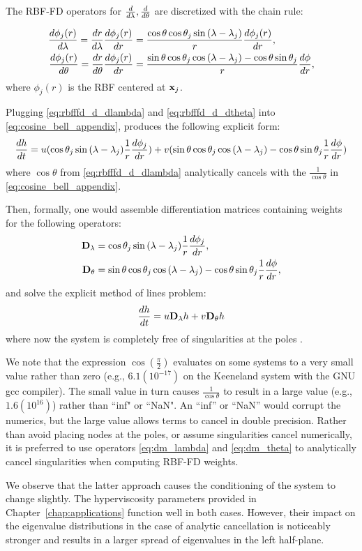 The RBF-FD operators for $\frac{d }{d \lambda}, \frac{d }{d \theta}$ are discretized with the chain rule: 

\begin{align}
\frac{d \phi_{j}(r)}{d \lambda} = \frac{d r}{d \lambda} \frac{d \phi_{j}(r)}{d r} & = \frac{\cos{\theta}\cos{\theta_j}\sin{(\lambda - \lambda_j)}}{r} \frac{d \phi_j(r)}{d r}, \label{eq:rbfffd_d_dlambda} \\
\frac{d \phi_{j}(r)}{d \theta} = \frac{d r}{d \theta} \frac{d \phi_{j}(r)}{d r} & = \frac{\sin{\theta}\cos{\theta_j}\cos{(\lambda-\lambda_j)} - \cos{\theta}\sin{\theta_j}}{r} \frac{d \phi}{d r}, \label{eq:rbfffd_d_dtheta}
\end{align}
where $\phi_{j}(r)$ is the RBF centered at $\mathbf{x}_{j}$. 

Plugging \ref{eq:rbfffd_d_dlambda} and \ref{eq:rbfffd_d_dtheta} into \ref{eq:cosine_bell_appendix}, produces the following explicit form: 
\begin{align*}
\frac{d h}{d t} = u(\cos{\theta_j}\sin{(\lambda - \lambda_j)} \frac{1}{r} \frac{d \phi_j}{d r}) + v (\sin{\theta}\cos{\theta_j}\cos{(\lambda-\lambda_j)} - \cos{\theta}\sin{\theta_j} \frac{1}{r} \frac{d \phi}{d r}) 
\end{align*}
where $\cos{\theta}$ from \ref{eq:rbfffd_d_dlambda} analytically cancels with the $\frac{1}{\cos{\theta}}$ in \ref{eq:cosine_bell_appendix}.


Then, formally, one would assemble differentiation matrices containing weights for the following operators: 
\begin{align}
\mathbf{D}_\lambda & = \cos{\theta_j}\sin{(\lambda - \lambda_j)} \frac{1}{r} \frac{d \phi_j}{d r}, \label{eq:dm_lambda} \\
\mathbf{D}_\theta &=  \sin{\theta}\cos{\theta_j}\cos{(\lambda-\lambda_j)} - \cos{\theta}\sin{\theta_j} \frac{1}{r} \frac{d \phi}{d r}, \label{eq:dm_theta}
\end{align} 
and solve the explicit method of lines problem:
$$
\frac{d h}{d t} = u \mathbf{D}_\lambda h + v \mathbf{D}_\theta h
$$
where now the system is completely free of singularities at the poles \cite{FlyerWright09}. 

We note that the expression $\cos{(\frac{\pi}{2})}$ evaluates on some systems to a very small value rather than zero (e.g., $6.1(10^{-17})$ on the Keeneland system with the GNU gcc compiler). The small value in turn causes $\frac{1}{\cos{\theta}}$ to result in a large value (e.g., $1.6(10^{16})$) rather than ``inf" or ``NaN". An ``inf'' or ``NaN'' would corrupt the numerics, but the large value allows terms to cancel in double precision. Rather than avoid placing nodes at the poles, or assume singularities cancel numerically, it is preferred to use operators \ref{eq:dm_lambda} and \ref{eq:dm_theta} to analytically cancel singularities when computing RBF-FD weights. 

We observe that the latter approach causes the conditioning of the system to change slightly. The hyperviscosity parameters provided in Chapter~\ref{chap:applications} function well in both cases. However, their impact on the eigenvalue distributions in the case of analytic cancellation is noticeably stronger and results in a larger spread of eigenvalues in the left half-plane. 
%
%
%
%
